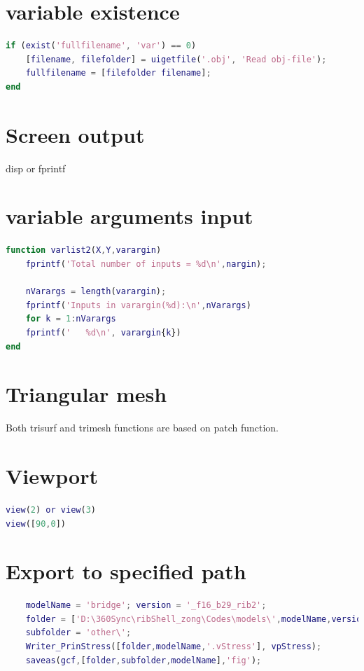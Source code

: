 \documentclass[10pt,a4paper]{article}
\begin{document}
\section{variable existence}
\begin{lstlisting}[language=matlab]
if (exist('fullfilename', 'var') == 0)
	[filename, filefolder] = uigetfile('.obj', 'Read obj-file');
	fullfilename = [filefolder filename];
end
\end{lstlisting}

\section{Screen output}
disp or fprintf

\section{variable arguments input}
\begin{lstlisting}[language=matlab]
function varlist2(X,Y,varargin)
	fprintf('Total number of inputs = %d\n',nargin);
	
	nVarargs = length(varargin);
	fprintf('Inputs in varargin(%d):\n',nVarargs)
	for k = 1:nVarargs
	fprintf('   %d\n', varargin{k})
end
\end{lstlisting}

\section{Triangular mesh}
Both trisurf and trimesh functions are based on patch function.

\section{Viewport}
\begin{lstlisting}[language=matlab]
view(2) or view(3)
view([90,0])
\end{lstlisting}

\section{Export to specified path}
\begin{lstlisting}[language=matlab]
	% note the folder must exist!
	modelName = 'bridge'; version = '_f16_b29_rib2';
	folder = ['D:\360Sync\ribShell_zong\Codes\models\',modelName,version,'\'];
	subfolder = 'other\';
	Writer_PrinStress([folder,modelName,'.vStress'], vpStress);
	saveas(gcf,[folder,subfolder,modelName],'fig');
\end{lstlisting}
\end{document}

